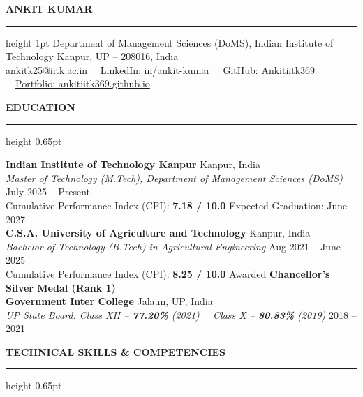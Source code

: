 \documentclass[10pt]{article}
\newcommand{\resumesection}[1]{%
  \vspace{4pt}%
  {\large \textbf{\uppercase{#1}}}%
  \vspace{1.5pt}%
  \hrule height 0.65pt%
  \vspace{3pt}%
}
\begin{document}
\begin{center}
    {\Huge \textbf{ANKIT KUMAR}}\\ 
    \vspace{2pt}
    \hrule height 1pt
    \vspace{4pt}
    Department of Management Sciences (DoMS), Indian Institute of Technology Kanpur, UP -- 208016, India\\
    \href{mailto:ankitk25@iitk.ac.in}{ankitk25@iitk.ac.in} \ \textbullet \ 
    \href{https://linkedin.com/in/ankit-kumar}{LinkedIn: in/ankit-kumar} \ \textbullet \ 
    \href{https://github.com/Ankitiitk369}{GitHub: Ankitiitk369} \ \textbullet \ 
    \href{https://ankitiitk369.github.io}{Portfolio: ankitiitk369.github.io}
\end{center}

\vspace{-4pt}

\resumesection{Education}

\textbf{Indian Institute of Technology Kanpur} \hfill Kanpur, India\\
\textit{Master of Technology (M.Tech), Department of Management Sciences (DoMS)} \hfill July 2025 -- Present\\
Cumulative Performance Index (CPI): \textbf{7.18 / 10.0} \hfill Expected Graduation: June 2027\\[3pt]
\textbf{C.S.A. University of Agriculture and Technology} \hfill Kanpur, India\\
\textit{Bachelor of Technology (B.Tech) in Agricultural Engineering} \hfill Aug 2021 -- June 2025\\
Cumulative Performance Index (CPI): \textbf{8.25 / 10.0} \hfill Awarded \textbf{Chancellor's Silver Medal (Rank 1)}\\[3pt]
\textbf{Government Inter College} \hfill Jalaun, UP, India\\
\textit{UP State Board: Class XII -- \textbf{77.20\%} (2021) \ \textbullet \ Class X -- \textbf{80.83\%} (2019)} \hfill 2018 -- 2021

\resumesection{Technical Skills \& Competencies}
\end{document}
